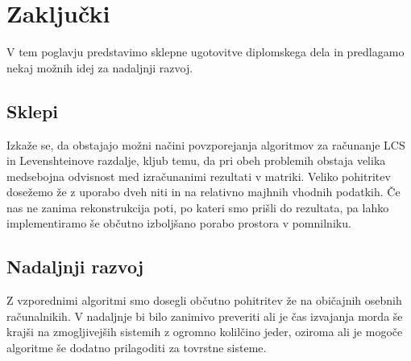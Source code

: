 \documentclass[a4paper,12pt,openright]{book}
\begin{document}
\chapter{Zaključki}

V tem poglavju predstavimo sklepne ugotovitve diplomskega dela in predlagamo nekaj možnih idej za nadaljnji razvoj.

\section{Sklepi}

Izkaže se, da obstajajo možni načini povzporejanja algoritmov za računanje LCS in Levenshteinove razdalje, kljub temu, da pri obeh problemih obstaja velika medsebojna odvisnost med izračunanimi rezultati v matriki. Veliko pohitritev dosežemo že z uporabo dveh niti in na relativno majhnih vhodnih podatkih. Če nas ne zanima rekonstrukcija poti, po kateri smo prišli do rezultata, pa lahko implementiramo še občutno izboljšano porabo prostora v pomnilniku. 

\section{Nadaljnji razvoj}

Z vzporednimi algoritmi smo dosegli občutno pohitritev že na običajnih osebnih računalnikih. V nadaljnje bi bilo zanimivo preveriti ali je čas izvajanja morda še krajši na zmogljivejših sistemih z ogromno kolilčino jeder, oziroma ali je mogoče algoritme še dodatno prilagoditi za tovrstne sisteme. 



\raggedright




\printbibliography[heading=bibintoc,title={Literatura}]
\end{document}
